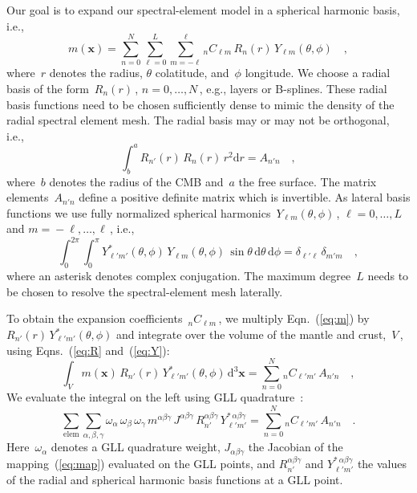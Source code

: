 Our goal is to expand our spectral-element model in a spherical harmonic basis, i.e.,
\begin{equation}
    m(\mathbf{x})=\sum_{n=0}^N\sum_{\ell = 0}^L\sum_{m=-\ell}^\ell {}_nC_{\ell m}\,R_n(r)\,Y_{\ell m}(\theta,\phi)
    \quad ,
    \label{eq:m}
\end{equation}
where~$r$ denotes the radius, $\theta$ colatitude, and~$\phi$ longitude.
We choose a radial basis of the form~$R_n(r)$\,, $n=0,\ldots,N$\,,
e.g., layers or B-splines.
These radial basis functions need to be chosen sufficiently dense to mimic the density of the radial spectral element mesh.
The radial basis may or may not be orthogonal,
i.e.,
\begin{equation}
    \int_b^a R_{n'}(r)\,R_{n}(r)\,r^2\mathrm{d}r = A_{n'n}
    \quad ,
    \label{eq:R}
\end{equation}
where~$b$ denotes the radius of the CMB and~$a$ the free surface.
The matrix elements~$A_{n'n}$ define a positive definite matrix which is invertible.
As lateral basis functions we use fully normalized spherical harmonics~$Y_{\ell m}(\theta,\phi)$\,, $\ell=0,\ldots,L$ and $m=\mbox{}-\ell,\ldots,\ell$\,, i.e.,~\cite{DT98}
\begin{equation}
    \int_0^{2\pi}\int_0^\pi Y^*_{\ell'm'}(\theta,\phi)\,Y_{\ell m}(\theta,\phi)\,\sin\theta\,\mathrm{d}\theta\,\mathrm{d}\phi = \delta_{\ell' \ell}\,\delta_{m'm}
    \quad ,
    \label{eq:Y}
\end{equation}
where an asterisk denotes complex conjugation.
The maximum degree~$L$ needs to be chosen to resolve the spectral-element mesh laterally.

To obtain the expansion coefficients~${}_nC_{\ell m}$\,, we multiply Eqn.~(\ref{eq:m}) by
$R_{n'}(r)\,Y^*_{\ell' m'}(\theta,\phi)$ and integrate over the volume of the mantle and crust,~$V$\,, using Eqns.~(\ref{eq:R} and~(\ref{eq:Y}):
\begin{equation}
    \int_V m(\mathbf{x})\,R_{n'}(r)\,Y^*_{\ell' m'}(\theta,\phi)\,\mathrm{d}^3\mathbf{x}=\sum_{n=0}^N {}_nC_{\ell' m'}\,A_{n'n}
    \quad ,
\end{equation}
We evaluate the integral on the left using GLL quadrature~\cite{KoTr99}:
\begin{equation}
    \sum_{\mathrm{elem}}\sum_{\alpha,\beta,\gamma}\omega_\alpha\,\omega_\beta\,\omega_\gamma\,m^{\alpha\beta\gamma}\,J^{\alpha\beta\gamma}\,R_{n'}^{\alpha\beta\gamma}\,Y_{\ell'm'}^{*\,\alpha\beta\gamma}
    =\sum_{n=0}^N {}_nC_{\ell' m'}\,A_{n'n}
    \quad .
\end{equation}
Here~$\omega_\alpha$ denotes a GLL quadrature weight,
$J_{\alpha\beta\gamma}$ the Jacobian of the mapping~(\ref{eq:map}) evaluated on the GLL points,
and $R_{n'}^{\alpha\beta\gamma}$ and $Y_{\ell'm'}^{*\,\alpha\beta\gamma}$ the values of the radial and spherical harmonic basis functions at a GLL point.

